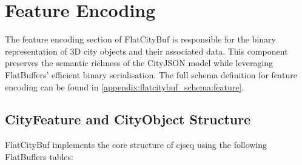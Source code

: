 
\section{Feature Encoding}
\label{methodology:feature_encoding}

The feature encoding section of FlatCityBuf is responsible for the binary representation of 3D city objects and their associated data. This component preserves the semantic richness of the CityJSON model while leveraging FlatBuffers' efficient binary serialisation. The full schema definition for feature encoding can be found in \autoref{appendix:flatcitybuf_schema:feature}.

\subsection{CityFeature and CityObject Structure}
\label{methodology:feature_encoding:cityfeature_cityobject_structure}

FlatCityBuf implements the core structure of \ac{cjseq} using the following FlatBuffers tables:

